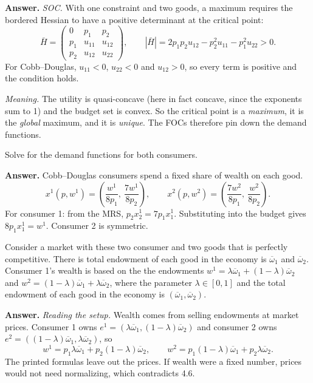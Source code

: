 \documentclass[11pt]{article}
\newcommand{\bw}{\overline{\omega}}
\newenvironment{solution}{\par\smallskip\noindent\textbf{Answer.} }{\par\medskip}
\begin{document}
\begin{description}
\begin{solution}
\emph{SOC.} With one constraint and two goods, a maximum requires the bordered Hessian to have a positive determinant at the critical point:
\[
\bar H=\begin{pmatrix}0&p_1&p_2\\ p_1&u_{11}&u_{12}\\ p_2&u_{12}&u_{22}\end{pmatrix},\qquad
|\bar H|=2p_1p_2u_{12}-p_2^2u_{11}-p_1^2u_{22}>0.
\]
For Cobb--Douglas, $u_{11}<0$, $u_{22}<0$ and $u_{12}>0$, so every term is positive and the condition holds.

\emph{Meaning.} The utility is quasi-concave (here in fact concave, since the exponents sum to 1) and the budget set is convex. So the critical point is a \emph{maximum}, it is the \emph{global} maximum, and it is \emph{unique}. The FOCs therefore pin down the demand functions.
\end{solution}

\item[4.4] Solve for the demand functions for both consumers.
\begin{solution}
Cobb--Douglas consumers spend a fixed share of wealth on each good.
\[
x^1(p,w^1)=\left(\frac{w^1}{8p_1},\ \frac{7w^1}{8p_2}\right),\qquad
x^2(p,w^2)=\left(\frac{7w^2}{8p_1},\ \frac{w^2}{8p_2}\right).
\]
For consumer 1: from the MRS, $p_2x_2^1=7p_1x_1^1$. Substituting into the budget gives $8p_1x_1^1=w^1$. Consumer 2 is symmetric.
\end{solution}
\end{description}

Consider a market with these two consumer and two goods that is perfectly competitive. There is total endowment of each good in the economy is $\bw_1$ and $\bw_2$. Consumer 1's wealth is based on the the endowments $w^1=\lambda\bw_1+(1-\lambda)\bw_2$ and $w^2=(1-\lambda)\bw_1+\lambda\bw_2$, where the parameter $\lambda\in[0,1]$ and the total endowment of each good in the economy is $(\bw_1,\bw_2)$.

\begin{solution}
\emph{Reading the setup.} Wealth comes from selling endowments at market prices. Consumer 1 owns $e^1=(\lambda\bw_1,(1-\lambda)\bw_2)$ and consumer 2 owns $e^2=((1-\lambda)\bw_1,\lambda\bw_2)$, so
\[
w^1=p_1\lambda\bw_1+p_2(1-\lambda)\bw_2,\qquad w^2=p_1(1-\lambda)\bw_1+p_2\lambda\bw_2.
\]
The printed formulas leave out the prices. If wealth were a fixed number, prices would not need normalizing, which contradicts 4.6.
\end{solution}
\end{document}
